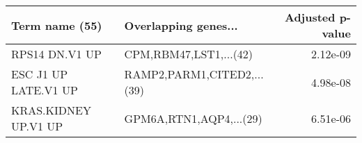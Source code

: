 \begin{tabular}{llr}
\toprule
      Term name (55) &       Overlapping genes... &  Adjusted p-value \\
\midrule
      RPS14 DN.V1 UP &     CPM,RBM47,LST1,...(42) &          2.12e-09 \\
ESC J1 UP LATE.V1 UP & RAMP2,PARM1,CITED2,...(39) &          4.98e-08 \\
KRAS.KIDNEY UP.V1 UP &    GPM6A,RTN1,AQP4,...(29) &          6.51e-06 \\
\bottomrule
\end{tabular}
